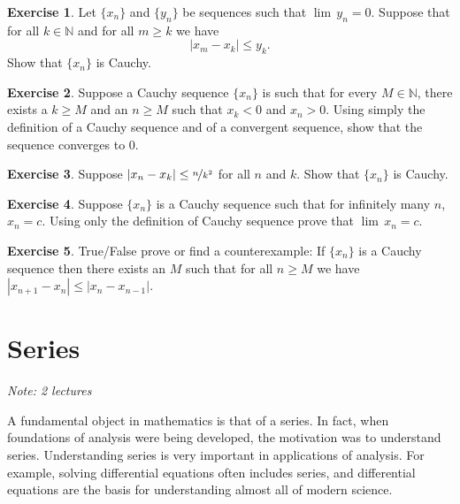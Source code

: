 \documentclass[12pt]{book}
\newcommand{\abs}[1]{\left\lvert {#1} \right\rvert}
\newcommand{\N}{{\mathbb{N}}}
\newcommand{\sectionnotes}[1]{\noindent \emph{Note: #1} \medskip \par}
\newcommand{\sectionnewpage}{\clearpage}
\theoremstyle{plain}
\theoremstyle{remark}
\theoremstyle{definition}
\theoremstyle{exercise}
\newtheorem{exercise}{Exercise}[section]
\theoremstyle{example}
\begin{document}
\begin{exercise}
Let $\{ x_n \}$ and $\{ y_n \}$ be sequences such
that $\lim\, y_n =0$.  Suppose that for all $k \in \N$
and
for all $m \geq k$ we have
\begin{equation*}
\abs{x_m-x_k} \leq y_k .
\end{equation*}
Show that $\{ x_n \}$ is Cauchy.
\end{exercise}

\begin{exercise}
Suppose a Cauchy sequence $\{ x_n \}$ is such that for every $M \in \N$,
there exists a $k \geq M$ and an $n \geq M$ such that
$x_k < 0$ and $x_n > 0$.  Using simply the definition of a Cauchy sequence
and of a convergent sequence, show that
the sequence converges to $0$.
\end{exercise}

\begin{exercise}
Suppose $\abs{x_n-x_k} \leq \nicefrac{n}{k^2}$ for all $n$ and $k$.
Show that $\{ x_n \}$ is Cauchy.
\end{exercise}

\begin{exercise}
Suppose $\{ x_n \}$ is a Cauchy sequence such that for infinitely many
$n$, $x_n = c$.  Using only the definition of Cauchy sequence prove 
that $\lim\, x_n = c$.
\end{exercise}

\begin{exercise}
True/False prove or find a counterexample:  If $\{ x_n \}$ is a Cauchy sequence then there exists an $M$
such that for all $n \geq M$ we have
$\abs{x_{n+1}-x_n}
\leq
\abs{x_{n}-x_{n-1}}$.
\end{exercise}



\sectionnewpage
\section{Series}
\label{sec:series}

\sectionnotes{2 lectures}

A fundamental object in mathematics is that of a series.  In fact, when
foundations of analysis were being developed, the motivation was to
understand series.  Understanding series is very important in applications
of analysis.  For example, solving differential equations often includes
series, and differential equations are the basis for understanding
almost all of modern science.
\end{document}
